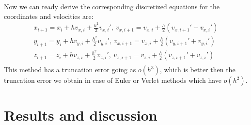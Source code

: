 \documentclass[10pt]{article}
\begin{document}
Now we can ready derive the corresponding discretized equations for the coordinates and velocities are:
\begin{equation}
\begin{aligned} 
x_{i+1}=x_{i}+hv_{x,i}+\frac{h^2}{2}v_{x,i}',\ 
v_{x,i+1}=v_{x,i}+\frac{h}{2}(v_{x,i+1}'+v_{x,i}')\\
y_{i+1}=y_{i}+hv_{y,i}+\frac{h^2}{2}v_{y,i}',\ 
v_{x,i+1}=v_{x,i}+\frac{h}{2}(v_{y,i+1}'+v_{y,i}')\\
z_{i+1}=z_{i}+hv_{z,i}+\frac{h^2}{2}v_{z,i}',\ 
v_{x,i+1}=v_{z,i}+\frac{h}{2}(v_{z,i+1}'+v_{z,i}')\\
\end{aligned}
\end{equation}
This method has a truncation error going as $o(h^3)$, which is better then the truncation error we obtain in case of Euler or Verlet methods which have $o(h^2)$.

\section{Results and discussion}\label{results}
\end{document}
